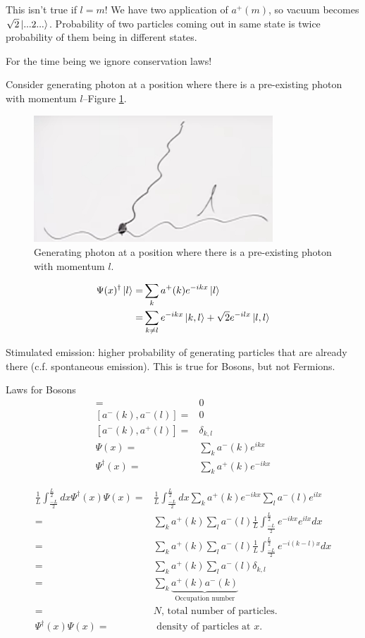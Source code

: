 \documentclass[]{article}
\begin{document}
This isn't true if $l=m$! We have two application of $a^+(m)$, so vacuum becomes $\sqrt{2}\ket{...2...}$. Probability of two particles coming out in same state is twice probability of them being in different states.

For the time being we ignore conservation laws!

Consider generating photon at a position where there is a pre-existing photon with momentum $l$--Figure \ref{fig:simple:decay}.
\begin{figure}[H]
	\caption[Generating photon  where there is a pre-existing photon]{Generating photon at a position where there is a pre-existing photon with momentum $l$.}\label{fig:simple:decay}
	\includegraphics[width=0.8\textwidth]{decay}
\end{figure}

\begin{align*}
\Psi(x)^\dagger\ket{l} =& \sum_k a^+(k) e^{-ikx} \ket{l}\\
=& \sum_{k\ne l} e^{-ikx} \ket{k,l} + \sqrt{2} e^{-ilx} \ket{l,l}
\end{align*}

Stimulated emission: higher probability of generating particles that are already there (c.f. spontaneous emission). This is true for Bosons, but not Fermions.
 
 Laws for Bosons
 \begin{align*}
 [a^+(k),a^+(l)] =& 0\\
 [a^-(k),a^-(l)] =& 0\\
 [a^-(k),a^+(l)] =& \delta_{k,l}\\
 \Psi(x) =& \sum_k a^-(k) e^{ikx} \\
 \Psi^\dagger(x) =& \sum_k a^+(k) e^{-ikx}
 \end{align*}
 
 \begin{align*}
 \frac{1}{L}\int_\frac{-L}{2}^\frac{L}{2} dx \Psi^\dagger(x) \Psi(x) =& \frac{1}{L} \int_\frac{-L}{2}^\frac{L}{2} dx \sum_k a^+(k) e^{-ikx} \sum_l a^-(l) e^{ilx}\\
 =& \sum_k a^+(k) \sum_l a^-(l) \frac{1}{L} \int_\frac{-L}{2}^\frac{L}{2} e^{-ikx} e^{ilx} dx\\
 =& \sum_k a^+(k) \sum_l a^-(l) \frac{1}{L} \int_\frac{-L}{2}^\frac{L}{2} e^{-i(k-l)x} dx\\
  =& \sum_k a^+(k) \sum_l a^-(l) \delta_{k,l}\\
 =&  \sum_k \underbrace{a^+(k) a^-(k)}_\text{Occupation number}\\
 =& N \text{, total number of particles.}\\
 \Psi^\dagger(x) \Psi(x) =& \text{ density of particles at $x$}.
 \end{align*}
\end{document}

